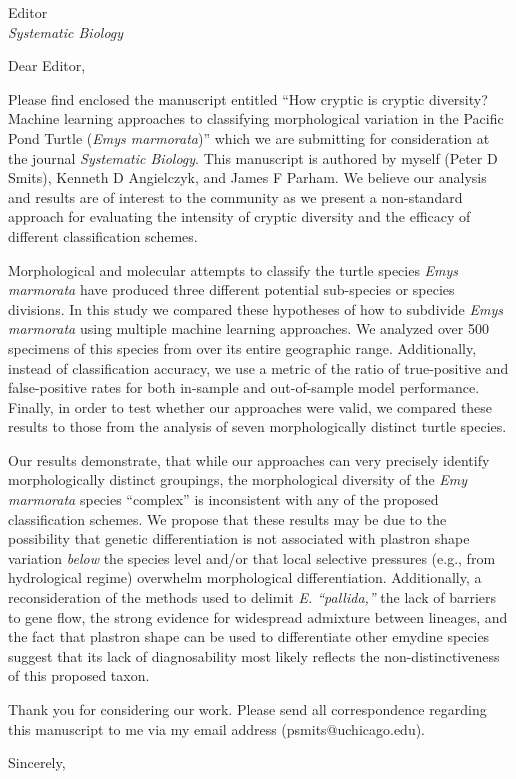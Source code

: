 \documentclass{letter}
\begin{document}
\begin{letter}{Editor \\ \textit{Systematic Biology}}
  \opening{Dear Editor,}

  Please find enclosed the manuscript entitled ``How cryptic is cryptic diversity? Machine learning approaches to classifying morphological variation in the Pacific Pond Turtle (\textit{Emys marmorata})'' which we are submitting for consideration at the journal \textit{Systematic Biology}. This manuscript is authored by myself (Peter D Smits), Kenneth D Angielczyk, and James F Parham. We believe our analysis and results are of interest to the community as we present a non-standard approach for evaluating the intensity of cryptic diversity and the efficacy of different classification schemes.

  Morphological and molecular attempts to classify the turtle species \textit{Emys marmorata} have produced three different potential sub-species or species divisions. In this study we compared these hypotheses of how to subdivide \textit{Emys marmorata} using multiple machine learning approaches. We analyzed over 500 specimens of this species from over its entire geographic range. Additionally, instead of classification accuracy, we use a metric of the ratio of true-positive and false-positive rates for both in-sample and out-of-sample model performance. Finally, in order to test whether our approaches were valid, we compared these results to those from the analysis of seven morphologically distinct turtle species.

  Our results demonstrate, that while our approaches can very precisely identify morphologically distinct groupings, the morphological diversity of the \textit{Emy marmorata} species ``complex'' is inconsistent with any of the proposed classification schemes. We propose that these results may be due to the possibility that genetic differentiation is not associated with plastron shape variation \textit{below} the species level and/or that local selective pressures (e.g., from hydrological regime) overwhelm morphological differentiation. Additionally, a reconsideration of the methods used to delimit \textit{E. ``pallida,''} the lack of barriers to gene flow, the strong evidence for widespread admixture between lineages, and the fact that plastron shape can be used to differentiate other emydine species suggest that its lack of diagnosability most likely reflects the non-distinctiveness of this proposed taxon.
  
  Thank you for considering our work. Please send all correspondence regarding this manuscript to me via my email address (psmits@uchicago.edu).

  \closing{Sincerely,}


\end{letter}
\end{document}
